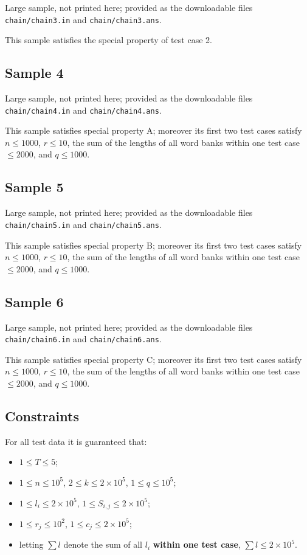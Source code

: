 \documentclass[11pt]{article}
\begin{document}
Large sample, not printed here;
provided as the downloadable files \texttt{chain/chain3.in} and \texttt{chain/chain3.ans}.

This sample satisfies the special property of test case 2.

\subsection*{Sample 4}

Large sample, not printed here;
provided as the downloadable files \texttt{chain/chain4.in} and \texttt{chain/chain4.ans}.

This sample satisfies special property A; moreover its first two test cases
satisfy $n \leq 1000$, $r \leq 10$, the sum of the lengths of all word
banks within one test case $\leq 2000$, and $q \leq 1000$.

\subsection*{Sample 5}

Large sample, not printed here;
provided as the downloadable files \texttt{chain/chain5.in} and \texttt{chain/chain5.ans}.

This sample satisfies special property B; moreover its first two test cases
satisfy $n \leq 1000$, $r \leq 10$, the sum of the lengths of all word
banks within one test case $\leq 2000$, and $q \leq 1000$.

\subsection*{Sample 6}

Large sample, not printed here;
provided as the downloadable files \texttt{chain/chain6.in} and \texttt{chain/chain6.ans}.

This sample satisfies special property C; moreover its first two test cases
satisfy $n \leq 1000$, $r \leq 10$, the sum of the lengths of all word
banks within one test case $\leq 2000$, and $q \leq 1000$.

\subsection*{Constraints}

For all test data it is guaranteed that:
\begin{itemize}
\item $1 \leq T \leq 5$;
\item $1 \leq n \leq 10^5$, $2 \leq k \leq 2 \times 10^5$,
$1 \leq q \leq 10^5$;
\item $1 \leq l_i \leq 2 \times 10^5$, $1 \leq S_{i,j} \leq 2 \times 10^5$;
\item $1 \leq r_j \leq 10^2$, $1 \leq c_j \leq 2 \times 10^5$;
\item letting $\sum l$ denote the sum of all $l_i$
\textbf{within one test case}, $\sum l \leq 2 \times 10^5$.
\end{itemize}
\end{document}
